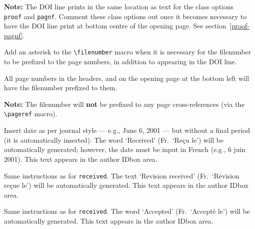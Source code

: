 \begin{description}
         {\bf Note:} The {\small DOI} line prints in the same location
         as text for the class options \verb|proof| and
         \verb|pagnf|. Comment these class options out once it becomes
         necessary to have the {\small DOI} line print at bottom
         centre of the opening page. See section~\ref{proof-pagnf}.


   \item [{\tt \blash filenumber*\char`\{...\char`\}}] \mbox{}

         Add an asterisk to the \verb|\filenumber| macro when it is
         necessary for the filenumber to be prefixed to the page
         numbers, in addition to appearing in the DOI line.

         All page numbers in the headers, and on the opening page at
         the bottom left will have the filenumber prefixed to them. 

         {\bf Note:} The filenumber will {\bf not} be prefixed to any
         page cross-references (via the \verb|\pageref| macro).


   \item [{\tt \blash received\char`\{...\char`\}}] \mbox{}

         Insert date as per journal style --- e.g., June 6, 2001 ---
         but without a final period (it is automatically inserted).
         The word `Received' (Fr.\ `Re\c cu le') will be automatically
         generated; however, the date must be input in French (e.g., 6
         juin 2001). This text appears in the author IDbox area.
         
\newpage

   \item [{\tt \blash revreceived\char`\{...\char`\}}] \mbox{}

         Same instructions as for \texttt{\blash received}. The text
         `Revision received' (Fr.\ `R\'evision re\c cue le') will be
         automatically generated. This text appears in the author
         IDbox area.
         

   \item [{\tt \blash accepted\char`\{...\char`\}}] \mbox{}

         Same instructions as for \texttt{\blash received}. The word
         `Accepted' (Fr.\ `Accept\'e le') will be automatically
         generated. This text appears in the author IDbox area.


   \item [{\tt \blash revaccepted\char`\{...\char`\}}] \mbox{}


\end{description}
